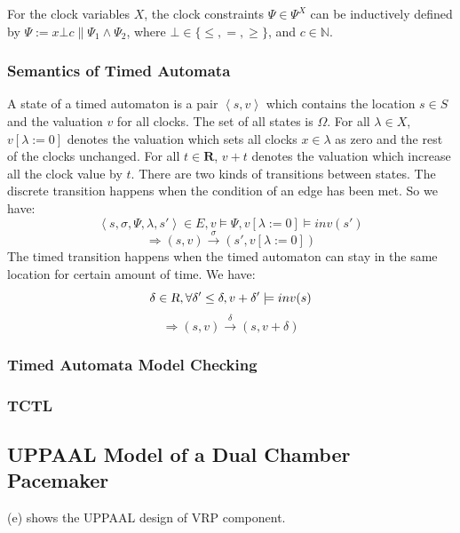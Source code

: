 For the clock variables $X$, the clock constraints $\Psi\in\Psi^X$ can be inductively defined by $\Psi:=x\bot c\|\Psi_1\wedge\Psi_2$, where $\bot\in\{\leq,=,\geq\}$, and $c\in\mathbb{N}$.
\subsubsection{Semantics of Timed Automata}
A state of a timed automaton is a pair $\left\langle s,v\right\rangle$ which contains the location $s\in S$ and the valuation $v$ for all clocks. The set of all states is $\Omega$. For all $\lambda\in X$, $v[\lambda :=0]$ denotes the valuation which sets all clocks $x\in\lambda$ as zero and the rest of the clocks unchanged. For all $t\in \textbf{R}$, $v+t$ denotes the valuation which increase all the clock value by $t$. There are two kinds of transitions between states. The \textsf{discrete transition} happens when the condition of an edge has been met. So we have:
$$\left\langle s,\sigma,\Psi,\lambda,s'\right\rangle\in E,v\models \Psi,v[\lambda :=0]\models inv(s')$$
$$\Rightarrow (s,v)\xrightarrow{\sigma}(s',v[\lambda :=0])$$
The \textsf{timed transition} happens when the timed automaton can stay in the same location for certain amount of time. We have:
$$\delta\in \textsl{R},\forall \delta'\leq\delta, v+\delta'\models inv(s)$$
$$\Rightarrow (s,v)\xrightarrow{\delta}(s,v+\delta)$$

\subsubsection{Timed Automata Model Checking}

\subsubsection{TCTL}

\subsection{UPPAAL Model of a Dual Chamber Pacemaker}
(e) shows the UPPAAL design of VRP component.


